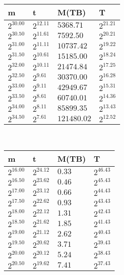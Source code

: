 \begin{tabular}{llll}
m & t & M(TB) & T \\ \hline
$2^{30.00}$ & $2^{12.11}$ & $5368.71$ & $2^{21.21}$ \\
$2^{30.50}$ & $2^{11.61}$ & $7592.50$ & $2^{20.21}$ \\
$2^{31.00}$ & $2^{11.11}$ & $10737.42$ & $2^{19.22}$ \\
$2^{31.50}$ & $2^{10.61}$ & $15185.00$ & $2^{18.24}$ \\
$2^{32.00}$ & $2^{10.11}$ & $21474.84$ & $2^{17.25}$ \\
$2^{32.50}$ & $2^{9.61}$ & $30370.00$ & $2^{16.28}$ \\
$2^{33.00}$ & $2^{9.11}$ & $42949.67$ & $2^{15.31}$ \\
$2^{33.50}$ & $2^{8.61}$ & $60740.01$ & $2^{14.36}$ \\
$2^{34.00}$ & $2^{8.11}$ & $85899.35$ & $2^{13.43}$ \\
$2^{34.50}$ & $2^{7.61}$ & $121480.02$ & $2^{12.52}$ \\
\end{tabular}
 \ 
\begin{tabular}{llll}
m & t & M(TB) & T \\ \hline
$2^{16.00}$ & $2^{24.12}$ & $0.33$ & $2^{46.43}$ \\
$2^{16.50}$ & $2^{23.62}$ & $0.46$ & $2^{45.43}$ \\
$2^{17.00}$ & $2^{23.12}$ & $0.66$ & $2^{44.43}$ \\
$2^{17.50}$ & $2^{22.62}$ & $0.93$ & $2^{43.43}$ \\
$2^{18.00}$ & $2^{22.12}$ & $1.31$ & $2^{42.43}$ \\
$2^{18.50}$ & $2^{21.62}$ & $1.85$ & $2^{41.43}$ \\
$2^{19.00}$ & $2^{21.12}$ & $2.62$ & $2^{40.43}$ \\
$2^{19.50}$ & $2^{20.62}$ & $3.71$ & $2^{39.43}$ \\
$2^{20.00}$ & $2^{20.12}$ & $5.24$ & $2^{38.43}$ \\
$2^{20.50}$ & $2^{19.62}$ & $7.41$ & $2^{37.43}$ \\
\end{tabular}
 \ 
